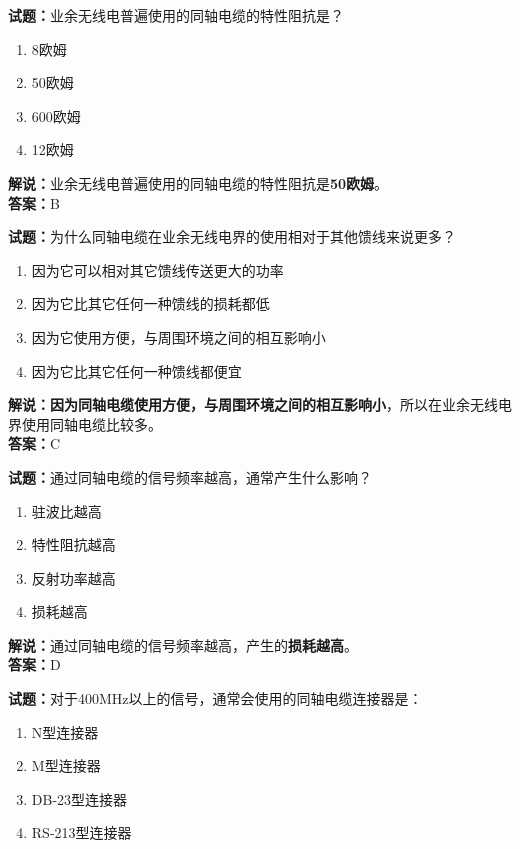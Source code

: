 \documentclass{ctexbook}
\begin{document}
\bigskip


\noindent\textbf{试题：}业余无线电普遍使用的同轴电缆的特性阻抗是？

\begin{enumerate}[leftmargin=3em]
	\item 8欧姆
	\item 50欧姆
	\item 600欧姆
	\item 12欧姆
\end{enumerate}

\noindent\textbf{解说：}业余无线电普遍使用的同轴电缆的特性阻抗是\textbf{50欧姆}。\\\noindent\textbf{答案：}B


\bigskip


\noindent\textbf{试题：}为什么同轴电缆在业余无线电界的使用相对于其他馈线来说更多？

\begin{enumerate}[leftmargin=3em]
	\item 因为它可以相对其它馈线传送更大的功率
	\item 因为它比其它任何一种馈线的损耗都低
	\item 因为它使用方便，与周围环境之间的相互影响小
	\item 因为它比其它任何一种馈线都便宜
\end{enumerate}

\noindent\textbf{解说：}\textbf{因为同轴电缆使用方便，与周围环境之间的相互影响小}，所以在业余无线电界使用同轴电缆比较多。\\\noindent\textbf{答案：}C


\bigskip


\noindent\textbf{试题：}通过同轴电缆的信号频率越高，通常产生什么影响？

\begin{enumerate}[leftmargin=3em]
	\item 驻波比越高
	\item 特性阻抗越高
	\item 反射功率越高
	\item 损耗越高
\end{enumerate}

\noindent\textbf{解说：}通过同轴电缆的信号频率越高，产生的\textbf{损耗越高}。\\\noindent\textbf{答案：}D


\bigskip


\noindent\textbf{试题：}对于400MHz以上的信号，通常会使用的同轴电缆连接器是：

\begin{enumerate}[leftmargin=3em]
	\item N型连接器
	\item M型连接器
	\item DB-23型连接器
	\item RS-213型连接器
\end{enumerate}
\end{document}
